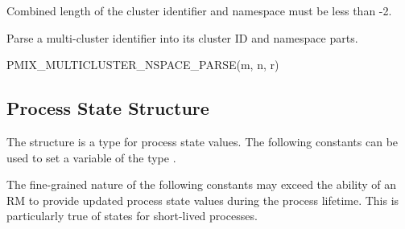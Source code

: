 \begin{arglist}
\end{arglist}

Combined length of the cluster identifier and namespace must be less than -2.


Parse a multi-cluster identifier into its cluster ID and namespace parts.

\cspecificstart
\begin{codepar}
PMIX_MULTICLUSTER_NSPACE_PARSE(m, n, r)
\end{codepar}
\cspecificend

\begin{arglist}
\end{arglist}


\subsection{Process State Structure}
\label{api:struct:processstate}

The  structure is a  type for process state values. The following constants can be used to set a variable of the type .

\adviceuserstart
The fine-grained nature of the following constants may exceed the ability of an \ac{RM} to provide updated process state values during the process lifetime. This is particularly true of states for short-lived processes.
\adviceuserend

